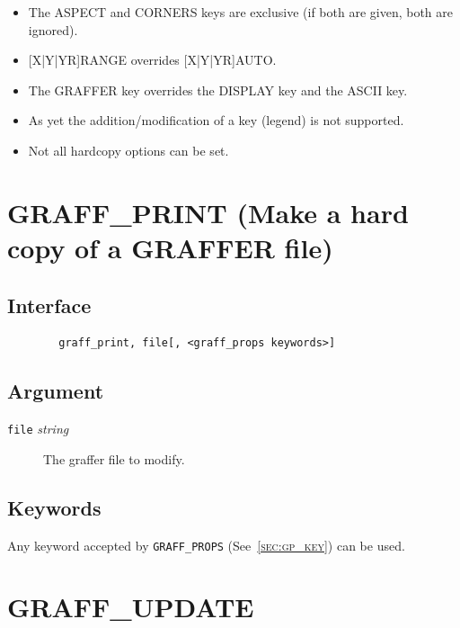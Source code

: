 \documentclass[11pt,twoside,english]{article}
\begin{document}
\begin{itemize}
\item The ASPECT and CORNERS keys are exclusive (if both are given,
  both are ignored).

\item {[X|Y|YR]}RANGE overrides {[X|Y|YR]}AUTO.

\item The GRAFFER key overrides the DISPLAY key and the ASCII key.

\item As yet the addition/modification of a key (legend) is not
  supported.

\item Not all hardcopy options can be set.

\end{itemize}


\section{GRAFF\_PRINT (Make a hard copy of a GRAFFER file)}
\label{sec:gh}


\subsection{Interface}
\label{sec:gh_interface}
\begin{verbatim}
        graff_print, file[, <graff_props keywords>]
\end{verbatim}


\subsection{Argument}
\label{sec:gh_args}

\begin{description}
\item[\texttt{file} \textit{string}] The graffer file to modify.
\end{description}


\subsection{Keywords}
\label{sec:gh_key}

Any keyword accepted by \texttt{GRAFF\_PROPS}
(See~\textsc{\autoref{sec:gp_key}}) can be used.

\section{GRAFF\_UPDATE}
\label{sec:graff_update}
\end{document}
